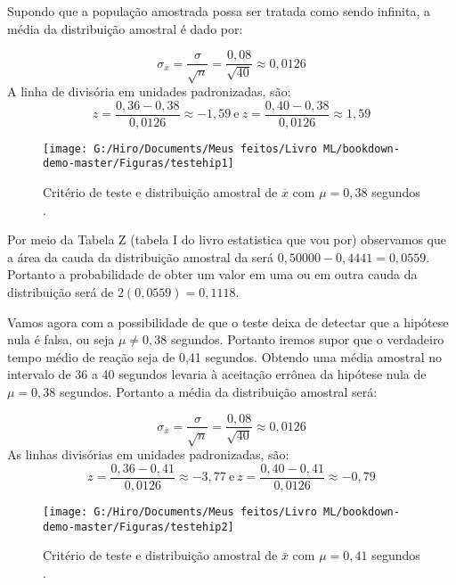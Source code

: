 \documentclass[
]{book}
\begin{document}
Supondo que a população amostrada possa ser tratada como sendo infinita, a média da distribuição amostral é dado por:

\[\sigma_{\overline{x}}=\frac{\sigma}{\sqrt{n}}=\frac{0,08}{\sqrt{40}}\approx 0,0126\]
A linha de divisória em unidades padronizadas, são:
\[z=\frac{0,36-0,38}{0,0126}\approx -1,59 \ \mbox{e} \ z=\frac{0,40-0,38}{0,0126}\approx 1,59\]

\begin{figure}

{\centering \texttt{[image: G:/Hiro/Documents/Meus feitos/Livro ML/bookdown-demo-master/Figuras/testehip1]} 

}

\caption{Critério de teste e distribuição amostral de \(\overline{x}\) com \(\mu =0,38\) segundos \citep{freund2009estatistica}.}\label{fig:testehip1}
\end{figure}



Por meio da Tabela Z (tabela I do livro estatistica que vou por) observamos que a área da cauda da distribuição amostral da será \(0,50000-0,4441=0,0559\). Portanto a probabilidade de obter um valor em uma ou em outra cauda da distribuição será de \(2(0,0559)=0,1118\).

Vamos agora com a possibilidade de que o teste deixa de detectar que a hipótese nula é falsa, ou seja \(\mu \neq 0,38\) segundos. Portanto iremos supor que o verdadeiro tempo médio de reação seja de 0,41 segundos. Obtendo uma média amostral no intervalo de 36 a 40 segundos levaria à aceitação errônea da hipótese nula de \(\mu=0,38\) segundos. Portanto a média da distribuição amostral será:

\[\sigma_{\overline{x}}=\frac{\sigma}{\sqrt{n}}=\frac{0,08}{\sqrt{40}}\approx 0,0126\]
As linhas divisórias em unidades padronizadas, são:
\[z=\frac{0,36-0,41}{0,0126}\approx -3,77 \ \mbox{e} \ z=\frac{0,40-0,41}{0,0126}\approx -0,79\]

\begin{figure}

{\centering \texttt{[image: G:/Hiro/Documents/Meus feitos/Livro ML/bookdown-demo-master/Figuras/testehip2]} 

}

\caption{Critério de teste e distribuição amostral de \(\overline{x}\) com \(\mu =0,41\) segundos \citep{freund2009estatistica}.}\label{fig:testehip2}
\end{figure}
\end{document}
